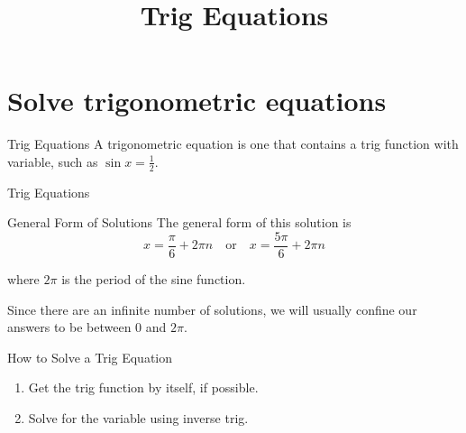 \documentclass[t,usenames,dvipsnames]{beamer}
\title{Trig Equations}
\author{}
\date{}
\begin{document}
\begin{frame}
    \maketitle
\end{frame}

\section{Solve trigonometric equations}

\begin{frame}{Trig Equations}
    A \alert{trigonometric equation} is one that contains a trig function with variable, such as $\sin x = \frac{1}{2}$.
\end{frame}

\begin{frame}{Trig Equations}
\begin{center}
\end{center}
\end{frame}

\begin{frame}{General Form of Solutions}
The \alert{general form} of this solution is
\[x = \frac{\pi}{6}+2\pi n \quad \text{or} \quad x = \frac{5\pi}{6} + 2\pi n \]   

where $2\pi$ is the \alert{period} of the sine function.  \newline\\  \pause

Since there are an infinite number of solutions, we will usually confine our answers to be between 0 and $2\pi$.
\end{frame}

\begin{frame}{How to Solve a Trig Equation}
    \begin{enumerate}
        \item Get the trig function by itself, if possible.    \newline\\
        \item Solve for the variable using inverse trig.
    \end{enumerate}
\end{frame}
\end{document}
